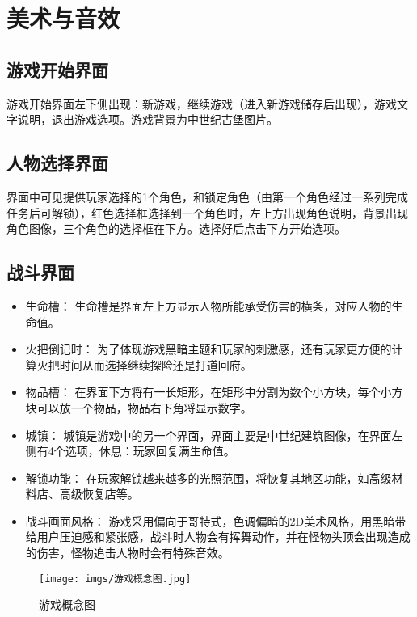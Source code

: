 \section{美术与音效}

\subsection{游戏开始界面}

游戏开始界面左下侧出现：新游戏，继续游戏（进入新游戏储存后出现），游戏文字说明，退出游戏选项。游戏背景为中世纪古堡图片。

\subsection{人物选择界面}

界面中可见提供玩家选择的1个角色，和锁定角色（由第一个角色经过一系列完成任务后可解锁），红色选择框选择到一个角色时，左上方出现角色说明，背景出现角色图像，三个角色的选择框在下方。选择好后点击下方开始选项。

\subsection{战斗界面}

\begin{itemize}
    \item 生命槽：
    生命槽是界面左上方显示人物所能承受伤害的横条，对应人物的生命值。
    \item 火把倒记时：
    为了体现游戏黑暗主题和玩家的刺激感，还有玩家更方便的计算火把时间从而选择继续探险还是打道回府。
    \item 物品槽：
    在界面下方将有一长矩形，在矩形中分割为数个小方块，每个小方块可以放一个物品，物品右下角将显示数字。
    \item 城镇：
    城镇是游戏中的另一个界面，界面主要是中世纪建筑图像，在界面左侧有4个选项，休息：玩家回复满生命值。
    \item 解锁功能：
    在玩家解锁越来越多的光照范围，将恢复其地区功能，如高级材料店、高级恢复店等。
    \item 战斗画面风格：
    游戏采用偏向于哥特式，色调偏暗的2D美术风格，用黑暗带给用户压迫感和紧张感，战斗时人物会有挥舞动作，并在怪物头顶会出现造成的伤害，怪物追击人物时会有特殊音效。
\end{itemize}

\begin{figure}[ht]
    \centering
    \texttt{[image: imgs/游戏概念图.jpg]}
    \caption{游戏概念图}
\end{figure}